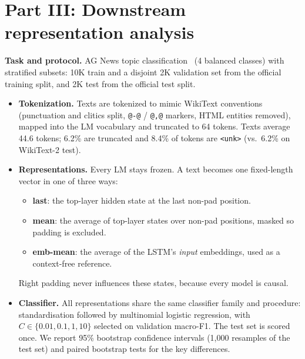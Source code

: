 \documentclass[10pt,a4paper]{article}
\newcommand{\tok}[1]{\texttt{\small #1}}
\begin{document}
\section{Part III: Downstream representation analysis}
\textbf{Task and protocol.} AG News topic classification~\cite{zhang2015} (4 balanced classes) with stratified subsets: 10K train and a disjoint 2K validation set from the official training split, and 2K test from the official test split.
\begin{itemize}
\item \textbf{Tokenization.} Texts are tokenized to mimic WikiText conventions (punctuation and clitics split, \tok{@-@} / \tok{@,@} markers, HTML entities removed), mapped into the LM vocabulary and truncated to 64 tokens. Texts average 44.6 tokens; 6.2\% are truncated and 8.4\% of tokens are \tok{<unk>} (vs.\ 6.2\% on WikiText-2 test).
\item \textbf{Representations.} Every LM stays frozen. A text becomes one fixed-length vector in one of three ways:
  \begin{itemize}
  \item \textbf{last}: the top-layer hidden state at the last non-pad position.
  \item \textbf{mean}: the average of top-layer states over non-pad positions, masked so padding is excluded.
  \item \textbf{emb-mean}: the average of the LSTM's \emph{input} embeddings, used as a context-free reference.
  \end{itemize}
  Right padding never influences these states, because every model is causal.
\item \textbf{Classifier.} All representations share the same classifier family and procedure: standardisation followed by multinomial logistic regression, with $C\in\{0.01, 0.1, 1, 10\}$ selected on validation macro-F1. The test set is scored once. We report 95\% bootstrap confidence intervals (1,000 resamples of the test set) and paired bootstrap tests for the key differences.
\end{itemize}
\end{document}

